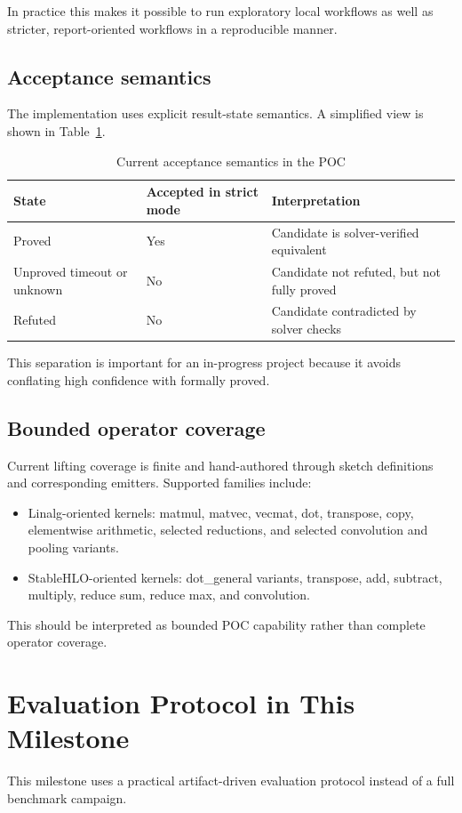 \documentclass[conference]{IEEEtran}
\begin{document}
In practice this makes it possible to run exploratory local workflows as well as stricter, report-oriented workflows in a reproducible manner.

\subsection{Acceptance semantics}
The implementation uses explicit result-state semantics. A simplified view is shown in Table~\ref{tab:acceptance_states}.

\begin{table}[t]
\caption{Current acceptance semantics in the POC}
\label{tab:acceptance_states}
\centering
\footnotesize
\begin{tabular}{p{}p{}p{}}
\toprule
State & Accepted in strict mode & Interpretation \\
\midrule
Proved & Yes & Candidate is solver-verified equivalent \\
Unproved timeout or unknown & No & Candidate not refuted, but not fully proved \\
Refuted & No & Candidate contradicted by solver checks \\
\bottomrule
\end{tabular}
\end{table}

This separation is important for an in-progress project because it avoids conflating high confidence with formally proved.

\subsection{Bounded operator coverage}
Current lifting coverage is finite and hand-authored through sketch definitions and corresponding emitters. Supported families include:
\begin{itemize}
\item Linalg-oriented kernels: matmul, matvec, vecmat, dot, transpose, copy, elementwise arithmetic, selected reductions, and selected convolution and pooling variants.
\item StableHLO-oriented kernels: dot\_general variants, transpose, add, subtract, multiply, reduce sum, reduce max, and convolution.
\end{itemize}

This should be interpreted as bounded POC capability rather than complete operator coverage.

\section{Evaluation Protocol in This Milestone}
This milestone uses a practical artifact-driven evaluation protocol instead of a full benchmark campaign.
\end{document}
